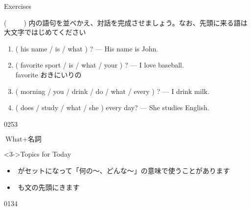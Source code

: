 \documentclass[aspectratio=169,xcolor={dvipsnames,table}]{beamer}
\begin{document}
\begin{frame}[plain]{Exercises}
 

(~~~~~) 内の語句を並べかえ、対話を完成させましょう。なお、先頭に来る語は大文字ではじめてください
\begin{enumerate}
 \item ( his name / is / what ) ? --- His name is John.\\
 \item ( favorite sport / is / what / your ) ? --- I love baseball.\\
\hfill{\scriptsize favorite  おきにいりの}
 \item ( morning / you / drink / do / what / every ) ? --- I drink milk.\\
 \item ( does / study / what / she ) every day? --- She studies English.\\
\end{enumerate}

\mbox{}\hfill{\tiny 0253}\,{\scriptsize {}}

\end{frame}
\begin{frame}[plain]{$\text{What} + \text{名詞}$}
\begin{enumerate}
\end{enumerate}

\begin{block}<3->{Topics for Today}
\pause
\begin{itemize}[square]\small
 \item {}\,\,がセットになって「何の〜、どんな～」の意味で使うことがあります
 \item {}\,\,も文の先頭にきます
\end{itemize}
     \end{block}

\mbox{}\hfill{\tiny 0134}\,{\scriptsize {}}



\end{frame}
\end{document}
